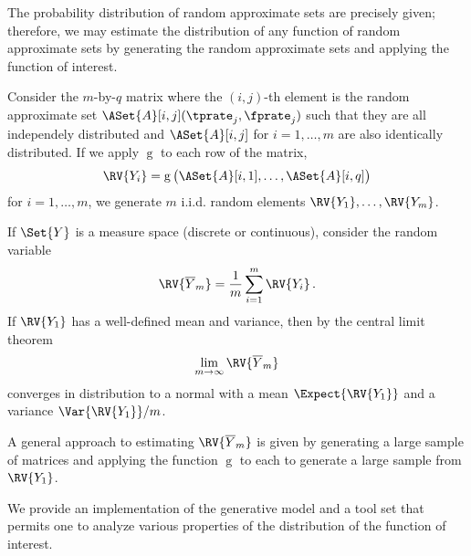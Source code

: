 \documentclass[ ../main.tex]{subfiles}
\begin{document}
{The probability distribution of random approximate sets are precisely given; therefore, we may estimate the distribution of any function of random approximate sets by generating the random approximate sets and applying the function of interest.

Consider the $m$-by-$q$ matrix where the $(i,j)$-th element is the random approximate set $\ASet{A}[i,j](\tprate_j,\fprate_j)$ such that they are all independely distributed and $\ASet{A}[i,j]$ for $i=1,\ldots, m$ are also identically distributed.
If we apply $\operatorname{g}$ to each row of the matrix,
\begin{equation}
\RV{Y_i} = \operatorname{g}\left(\ASet{A}[i,1],\ldots,\ASet{A}[i,q]\right)
\end{equation}
for $i=1,\ldots,m$, we generate $m$ i.i.d. random elements $\RV{Y_1},\ldots,\RV{Y_m}$.

If $\Set{Y}$ is a measure space (discrete or continuous), consider the random variable
\begin{equation}
\RV{\overline{Y}_m} = \frac{1}{m} \sum_{i=1}^{m} \RV{Y_i}\,.
\end{equation}
If $\RV{Y_1}$ has a well-defined mean and variance, then by the central limit theorem
\begin{equation}
\lim_{m \to \infty} \RV{\overline{Y}_m}
\end{equation}
converges in distribution to a normal with a mean $\Expect{\RV{Y_1}}$ and a variance $\Var{\RV{Y_1}} / m$.

A general approach to estimating $\RV{\overline{Y}_m}$ is given by generating a large sample of matrices and applying the function $\operatorname{g}$ to each to generate a large sample from $\RV{Y_1}$.

We provide an implementation of the generative model and a tool set that permits one to analyze various properties of the distribution of the function of interest.
}
\end{document}
